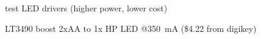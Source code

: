 \documentclass[12pt]{article} %
\begin{document}
\begin{compactitem}
\begin{compactitem}
	\end{compactitem}
	\item test LED drivers (higher power, lower cost)
	\begin{compactitem}
		\item LT3490 boost 2xAA to 1x HP LED @\SI{350}{\milli\ampere}
			(\$4.22 from digikey)
	\end{compactitem}
\end{compactitem}

\end{document}
